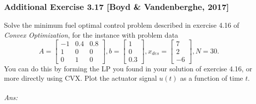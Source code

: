\documentclass[12pt,a4paper]{article}
\renewcommand{\l}{\left}\renewcommand{\r}{\right}
\begin{document}
\newpage\subsubsection*{Additional Exercise 3.17 [Boyd \& Vandenberghe, 2017]}
 Solve the minimum fuel optimal control problem described in exercise 4.16 of {\it Convex Optimization}, for the instance with problem data
$$A = \l[\begin{array}{ccc}
-1&0.4&0.8\\
1&0&0\\
0&1&0\end{array}\r], b = \l[\begin{array}{c}
1\\
0\\
0.3\end{array}\r], x_{des} = \l[\begin{array}{c}
7\\
2\\
-6\end{array}\r], N = 30.$$
You can do this by forming the LP you found in your solution of exercise 4.16, or more directly using CVX. Plot the actuator signal $u(t)$ as a function of time $t$. \\
\\
{\it Ans:} 
\end{document}

